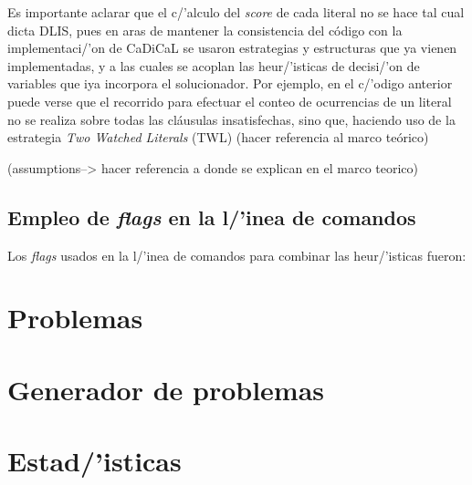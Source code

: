 Es importante aclarar que el c/'alculo del \textit{score} de cada literal no se hace tal cual dicta DLIS, pues en aras de mantener la consistencia del c\'odigo con la implementaci/'on de CaDiCaL se usaron estrategias y estructuras que ya vienen implementadas, y a las cuales se acoplan las heur/'isticas de decisi/'on de variables que iya incorpora el solucionador. Por ejemplo, en el c/'odigo anterior puede verse que el recorrido para efectuar el conteo de ocurrencias de un literal no se realiza sobre todas las cl\'ausulas insatisfechas, sino que, haciendo uso de la estrategia \textit{Two Watched Literals} (TWL) (hacer referencia al marco te\'orico) 

(assumptions--> hacer referencia a donde se explican en el marco teorico)

\subsection{Empleo de \textit{flags} en la l/'inea de comandos}
Los \textit{flags} usados en la l/'inea de comandos para combinar las heur/'isticas fueron:

\section{Problemas}
\section{Generador de problemas}
\section{Estad/'isticas}
